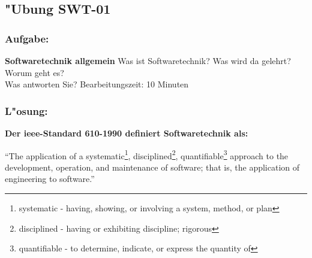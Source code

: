 

\subsection{"Ubung SWT-01}
\subsubsection*{Aufgabe:}

\begin{framed}
\textbf{Softwaretechnik allgemein}
\smallbreak
Was ist Softwaretechnik? Was wird da gelehrt? Worum geht es?
\\
Was antworten Sie?
\bigbreak
\small Bearbeitungszeit: 10 Minuten
\end{framed}
\bigbreak
\bigbreak
\subsubsection*{L"osung:}

\textbf{Der \gls{ieee}-Standard 610-1990 definiert Softwaretechnik als:}


\begin{center}
\enquote{The application of a  systematic\footnote{\label{foot:1}systematic - having, showing, or involving a system, method, or plan}, disciplined\footnote{\label{foot:2}disciplined - having or exhibiting discipline; rigorous}, quantifiable\footnote{\label{foot:3}quantifiable - to determine, indicate, or express the quantity of} approach to the development, operation, and maintenance of software; that is, the application of engineering to software.}
\end{center}

\bigbreak
\bigbreak

